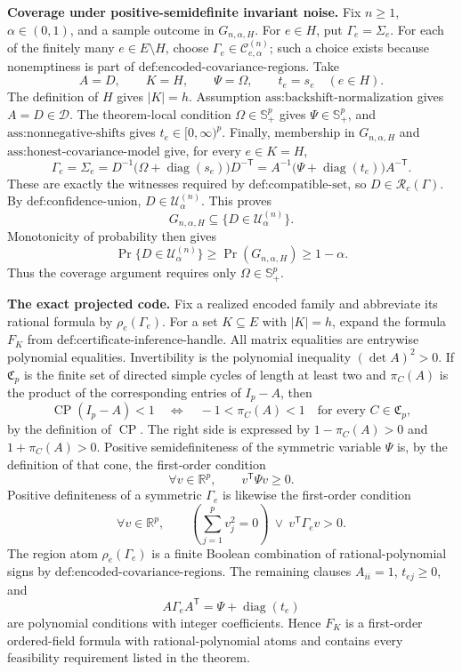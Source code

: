 \textbf{Coverage under positive-semidefinite invariant noise.}
Fix \(n\geq1\), \(\alpha\in(0,1)\), and a sample outcome in \(G_{n,\alpha,H}\). For \(e\in H\), put \(\Gamma_e=\Sigma_e\). For each of the finitely many \(e\in E\setminus H\), choose \(\Gamma_e\in\mathcal C^{(n)}_{e,\alpha}\); such a choice exists because nonemptiness is part of \(\text{def:encoded-covariance-regions}\). Take
\[
A=D,\qquad K=H,\qquad \Psi=\Omega,\qquad t_e=s_e\quad(e\in H).
\]
The definition of \(H\) gives \(|K|=h\). Assumption \(\text{ass:backshift-normalization}\) gives \(A=D\in\mathcal D\). The theorem-local condition \(\Omega\in\mathbb S_+^p\) gives \(\Psi\in\mathbb S_+^p\), and \(\text{ass:nonnegative-shifts}\) gives \(t_e\in[0,\infty)^p\). Finally, membership in \(G_{n,\alpha,H}\) and \(\text{ass:honest-covariance-model}\) give, for every \(e\in K=H\),
\[
\Gamma_e=\Sigma_e
=D^{-1}\bigl(\Omega+\operatorname{diag}(s_e)\bigr)D^{-\mathsf T}
=A^{-1}\bigl(\Psi+\operatorname{diag}(t_e)\bigr)A^{-\mathsf T}.
\]
These are exactly the witnesses required by \(\text{def:compatible-set}\), so \(D\in\mathcal R_c(\Gamma)\). By \(\text{def:confidence-union}\), \(D\in\mathcal U^{(n)}_\alpha\). This proves
\[
G_{n,\alpha,H}\subseteq\{D\in\mathcal U^{(n)}_\alpha\}.
\]
Monotonicity of probability then gives
\[
\Pr\{D\in\mathcal U^{(n)}_\alpha\}
\geq\Pr(G_{n,\alpha,H})\geq1-\alpha.
\]
Thus the coverage argument requires only \(\Omega\in\mathbb S_+^p\).

\textbf{The exact projected code.}
Fix a realized encoded family and abbreviate its rational formula by \(\rho_e(\Gamma_e)\). For a set \(K\subseteq E\) with \(|K|=h\), expand the formula \(F_K\) from \(\text{def:certificate-inference-handle}\). All matrix equalities are entrywise polynomial equalities. Invertibility is the polynomial inequality \((\det A)^2>0\). If \(\mathfrak C_p\) is the finite set of directed simple cycles of length at least two and \(\pi_C(A)\) is the product of the corresponding entries of \(I_p-A\), then
\[
\operatorname{CP}(I_p-A)<1
\quad\Longleftrightarrow\quad
-1<\pi_C(A)<1\quad\text{for every }C\in\mathfrak C_p,
\]
by the definition of \(\operatorname{CP}\). The right side is expressed by \(1-\pi_C(A)>0\) and \(1+\pi_C(A)>0\). Positive semidefiniteness of the symmetric variable \(\Psi\) is, by the definition of that cone, the first-order condition
\[
\forall v\in\mathbb R^p,\qquad v^{\mathsf T}\Psi v\geq0.
\]
Positive definiteness of a symmetric \(\Gamma_e\) is likewise the first-order condition
\[
\forall v\in\mathbb R^p,\qquad
\left(\sum_{j=1}^p v_j^2=0\right)
\ \vee\ v^{\mathsf T}\Gamma_ev>0.
\]
The region atom \(\rho_e(\Gamma_e)\) is a finite Boolean combination of rational-polynomial signs by \(\text{def:encoded-covariance-regions}\). The remaining clauses \(A_{ii}=1\), \(t_{ej}\geq0\), and
\[
A\Gamma_eA^{\mathsf T}=\Psi+\operatorname{diag}(t_e)
\]
are polynomial conditions with integer coefficients. Hence \(F_K\) is a first-order ordered-field formula with rational-polynomial atoms and contains every feasibility requirement listed in the theorem.

